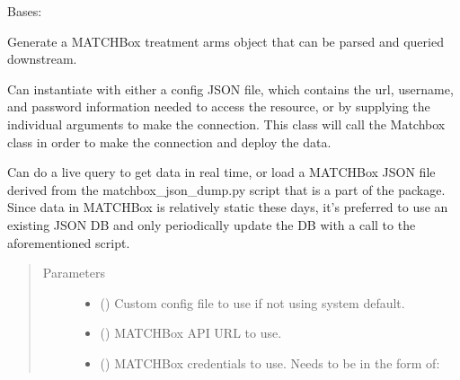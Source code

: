 \documentclass[letterpaper,10pt,english]{sphinxmanual}
\begin{document}
\begin{fulllineitems}
\label{\detokenize{matchbox_api_utils:matchbox_api_utils.match_arms.TreatmentArms}}
Bases: 


Generate a MATCHBox treatment arms object that can be parsed and queried
downstream.

Can instantiate with either a config JSON file, which contains the url,
username, and password information needed to access the resource, or by
supplying the individual arguments to make the connection.  This class
will call the Matchbox class in order to make the connection and deploy
the data.

Can do a live query to get data in real time, or load a MATCHBox JSON file
derived from the matchbox\_json\_dump.py script that is a part of the package.
Since data in MATCHBox is relatively static these days, it’s preferred to
use an existing JSON DB and only periodically update the DB with a call
to the aforementioned script.
\begin{quote}\begin{description}
\item[{Parameters}] \leavevmode\begin{itemize}
\item {} 
 () \textendash{} Custom config file to use if not using system default.

\item {} 
 () \textendash{} MATCHBox API URL to use.

\item {} 
 () \textendash{} 
MATCHBox credentials to use. Needs to be in the form of:


\end{itemize}
\end{description}
\end{quote}
\end{fulllineitems}
\end{document}
